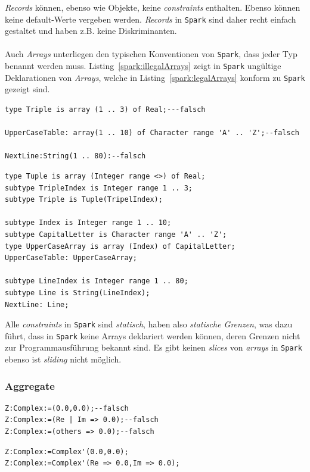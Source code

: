 \textit{Records} können, ebenso wie Objekte, keine \textit{constraints} enthalten. Ebenso können keine default-Werte vergeben werden. \textit{Records} in \texttt{Spark} sind daher recht einfach gestaltet und haben z.B. keine Diskriminanten.\\
\\
Auch \textit{Arrays} unterliegen den typischen Konventionen von \texttt{Spark}, dass jeder Typ benannt werden muss. Listing~\ref{spark:illegalArrays} zeigt in \texttt{Spark} ungültige Deklarationen von \textit{Arrays}, welche in Listing~\ref{spark:legalArrays} konform zu \texttt{Spark} gezeigt sind.

\begin{lstlisting}[caption={illegal Arrays}, label=spark:illegalArrays]
type Triple is array (1 .. 3) of Real;---falsch

UpperCaseTable: array(1 .. 10) of Character range 'A' .. 'Z';--falsch

NextLine:String(1 .. 80):--falsch
\end{lstlisting}
\begin{lstlisting}[caption={legal Arrays}, label=spark:legalArrays]
type Tuple is array (Integer range <>) of Real;
subtype TripleIndex is Integer range 1 .. 3;
subtype Triple is Tuple(TripelIndex);

subtype Index is Integer range 1 .. 10;
subtype CapitalLetter is Character range 'A' .. 'Z';
type UpperCaseArray is array (Index) of CapitalLetter;
UpperCaseTable: UpperCaseArray;

subtype LineIndex is Integer range 1 .. 80;
subtype Line is String(LineIndex);
NextLine: Line;
\end{lstlisting}

Alle \textit{constraints} in \texttt{Spark} sind \textit{statisch}, haben also \textit{statische Grenzen}, was dazu führt, dass in \texttt{Spark} keine Arrays deklariert werden können, deren Grenzen nicht zur Programmausführung bekannt sind.
Es gibt keinen \textit{slices} von \textit{arrays} in \texttt{Spark} ebenso ist \textit{sliding} nicht möglich.


\subsubsection{Aggregate}
\label{subsubsec:Aggregate}

\begin{lstlisting}[caption={illegal Aggregates}, label=spark:illegalAggregates]
Z:Complex:=(0.0,0.0);--falsch
Z:Complex:=(Re | Im => 0.0);--falsch
Z:Complex:=(others => 0.0);--falsch
\end{lstlisting}
\begin{lstlisting}[caption={legal Aggregates}, label=spark:legalAggregates]
Z:Complex:=Complex'(0.0,0.0);
Z:Complex:=Complex'(Re => 0.0,Im => 0.0);
\end{lstlisting}

